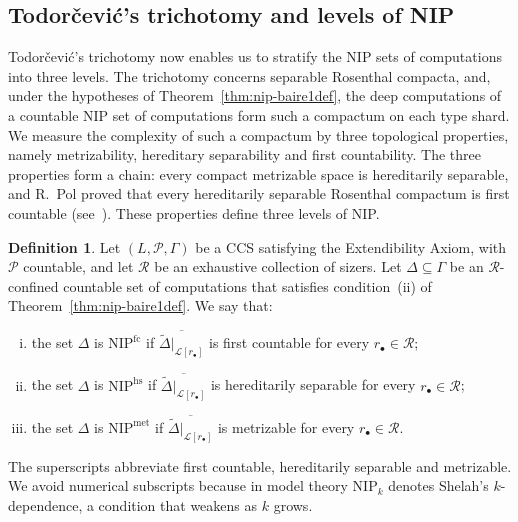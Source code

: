 \documentclass[psamsfonts]{amsart}
\theoremstyle{definition}
\newtheorem{defn}[thm]{Definition}
\theoremstyle{remark}
\newcommand{\NIP}{\text{NIP}}
\numberwithin{equation}{section}
\begin{document}
\subsection{Todorčević’s trichotomy and levels of NIP}
\label{sec:trichotomy}
Todorčević’s trichotomy now enables us to stratify the NIP sets of computations into three levels.
The trichotomy concerns separable Rosenthal compacta, and, under the hypotheses of Theorem~\ref{thm:nip-baire1def}, the deep computations of a countable $\NIP$ set of computations form such a compactum on each type shard.
We measure the complexity of such a compactum by three topological properties, namely metrizability, hereditary separability and first countability.
The three properties form a chain:
every compact metrizable space is hereditarily separable, and R.~Pol proved that every hereditarily separable Rosenthal compactum is first countable (see~\cite[Section~10]{debs2013rosenthal}).
These properties define three levels of NIP.

\begin{defn}\label{def:NIP-levels}
  Let $(L,\mathcal{P},\Gamma)$ be a CCS satisfying the Extendibility Axiom, with $\mathcal{P}$ countable, and let $\mathscr{R}$ be an exhaustive collection of sizers.
  Let $\Delta\subseteq\Gamma$ be an $\mathscr{R}$-confined countable set of computations that satisfies condition~(ii) of Theorem~\ref{thm:nip-baire1def}.
  We say that:
  \begin{enumerate}[(i)]
  \item
    the set $\Delta$ is $\NIP^{\mathrm{fc}}$ if $\overline{\tilde\Delta|_{\mathcal{L}[r_\bullet]}}$ is first countable for every $r_\bullet\in \mathscr{R}$;
  \item
    the set $\Delta$ is $\NIP^{\mathrm{hs}}$ if $\overline{\tilde\Delta|_{\mathcal{L}[r_\bullet]}}$ is hereditarily separable for every $r_\bullet\in \mathscr{R}$;
  \item
    the set $\Delta$ is $\NIP^{\mathrm{met}}$ if $\overline{\tilde\Delta|_{\mathcal{L}[r_\bullet]}}$ is metrizable for every $r_\bullet\in \mathscr{R}$.
  \end{enumerate}
\end{defn}

The superscripts abbreviate first countable, hereditarily separable and metrizable.
We avoid numerical subscripts because in model theory $\mathrm{NIP}_k$ denotes Shelah's $k$-dependence, a condition that weakens as $k$ grows.
\end{document}
